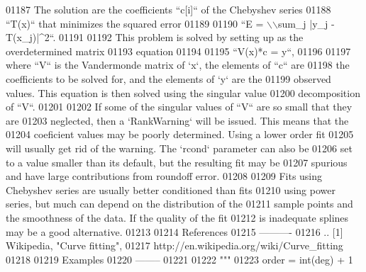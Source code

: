 \begin{DoxyCode}
01187 \textcolor{stringliteral}{    The solution are the coefficients ``c[i]`` of the Chebyshev series}
01188 \textcolor{stringliteral}{    ``T(x)`` that minimizes the squared error}
01189 \textcolor{stringliteral}{}
01190 \textcolor{stringliteral}{    ``E = \(\backslash\)\(\backslash\)sum\_j |y\_j - T(x\_j)|^2``.}
01191 \textcolor{stringliteral}{}
01192 \textcolor{stringliteral}{    This problem is solved by setting up as the overdetermined matrix}
01193 \textcolor{stringliteral}{    equation}
01194 \textcolor{stringliteral}{}
01195 \textcolor{stringliteral}{    ``V(x)*c = y``,}
01196 \textcolor{stringliteral}{}
01197 \textcolor{stringliteral}{    where ``V`` is the Vandermonde matrix of `x`, the elements of ``c`` are}
01198 \textcolor{stringliteral}{    the coefficients to be solved for, and the elements of `y` are the}
01199 \textcolor{stringliteral}{    observed values.  This equation is then solved using the singular value}
01200 \textcolor{stringliteral}{    decomposition of ``V``.}
01201 \textcolor{stringliteral}{}
01202 \textcolor{stringliteral}{    If some of the singular values of ``V`` are so small that they are}
01203 \textcolor{stringliteral}{    neglected, then a `RankWarning` will be issued. This means that the}
01204 \textcolor{stringliteral}{    coeficient values may be poorly determined. Using a lower order fit}
01205 \textcolor{stringliteral}{    will usually get rid of the warning.  The `rcond` parameter can also be}
01206 \textcolor{stringliteral}{    set to a value smaller than its default, but the resulting fit may be}
01207 \textcolor{stringliteral}{    spurious and have large contributions from roundoff error.}
01208 \textcolor{stringliteral}{}
01209 \textcolor{stringliteral}{    Fits using Chebyshev series are usually better conditioned than fits}
01210 \textcolor{stringliteral}{    using power series, but much can depend on the distribution of the}
01211 \textcolor{stringliteral}{    sample points and the smoothness of the data. If the quality of the fit}
01212 \textcolor{stringliteral}{    is inadequate splines may be a good alternative.}
01213 \textcolor{stringliteral}{}
01214 \textcolor{stringliteral}{    References}
01215 \textcolor{stringliteral}{    ----------}
01216 \textcolor{stringliteral}{    .. [1] Wikipedia, "Curve fitting",}
01217 \textcolor{stringliteral}{           http://en.wikipedia.org/wiki/Curve\_fitting}
01218 \textcolor{stringliteral}{}
01219 \textcolor{stringliteral}{    Examples}
01220 \textcolor{stringliteral}{    --------}
01221 \textcolor{stringliteral}{}
01222 \textcolor{stringliteral}{    """}
01223     order = int(deg) + 1

\end{DoxyCode}
